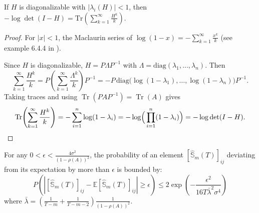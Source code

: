 \documentclass[11pt]{article}
\DeclareMathOperator{\Tr}{Tr}
\begin{document}
\begin{lemma}
\label{lemma:Log-determinant trace}
If $H$ is diagonalizable with $|\lambda_i(H)|<1$, then
\(
-\log\det(I-H)=\mathrm{Tr}\!\left(\sum_{k=1}^\infty \frac{H^k}{k}\right).
\)
\end{lemma}

\begin{proof}
\noindent For $|x|<1$, the Maclaurin series of $\log(1-x) = -\sum_{k=1}^\infty \frac{x^k}{k}$ (see example 6.4.4 in \cite{bilodeau2010introduction}).

Since $H$ is diagonalizable, $H = P\Lambda P^{-1}$ with $\Lambda = \mathrm{diag}(\lambda_1,\dots,\lambda_n)$. Then
\[
\sum_{k=1}^\infty \frac{H^k}{k}
= P\!\left(\sum_{k=1}^\infty \frac{\Lambda^k}{k}\right)P^{-1}
= -P\,\mathrm{diag}\!\big(\log(1-\lambda_1),\dots,\log(1-\lambda_n)\big)P^{-1}.
\]
Taking traces and using $\Tr(PAP^{-1})=\Tr(A)$ gives
\[
\Tr\!\left(\sum_{k=1}^\infty \frac{H^k}{k}\right)
= -\sum_{i=1}^n \log(1-\lambda_i)
= -\log\!\Big(\prod_{i=1}^n (1-\lambda_i)\Big)
= -\log\det(I-H). \qedhere
\]
\end{proof}

\begin{lemma}
\label{lem:Chernoff elementwise}
For any $0<\epsilon <\frac{4\sigma^2}{(1-\rho(A))^2}$, the probability of an element $[\hat{\mathbb{S}}_m(T)]_{ij}$ deviating from its expectation by more than $\epsilon$ is bounded by:
$$
P\left(\left|[\hat{\mathbb{S}}_m(T)]_{ij} - \mathbb{E}[\hat{\mathbb{S}}_m(T)]_{ij}\right| \ge \epsilon\right) \le 2\exp \left(- \frac{\epsilon^2}{16T\bar{\lambda}^2\sigma^4} \right)
$$
where $\bar{\lambda} = \left( \frac{1}{T-m} + \frac{1}{T-m-2} \right) \frac{1}{(1-\rho(A))^2}$. 
\end{lemma}
\end{document}
